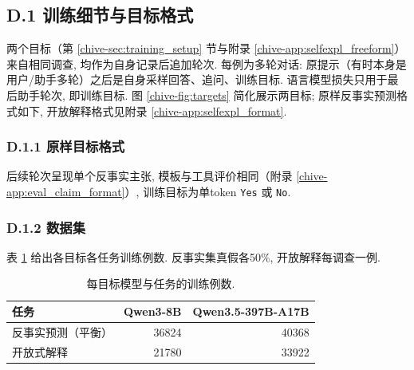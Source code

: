 \subsection*{D.1 训练细节与目标格式}
两个目标（第 \ref{chive-sec:training_setup} 节与附录 \ref{chive-app:selfexpl_freeform}）来自相同调查, 均作为自身记录后追加轮次. 每例为多轮对话: 原提示（有时本身是用户/助手多轮）之后是自身采样回答、追问、训练目标. 语言模型损失只用于最后助手轮次, 即训练目标. 图 \ref{chive-fig:targets} 简化展示两目标; 原样反事实预测格式如下, 开放解释格式见附录 \ref{chive-app:selfexpl_format}.

\subsubsection*{D.1.1 原样目标格式}
后续轮次呈现单个反事实主张, 模板与工具评价相同（附录 \ref{chive-app:eval_claim_format}）, 训练目标为单token \texttt{Yes} 或 \texttt{No}.

\subsubsection*{D.1.2 数据集}
表 \ref{chive-tab:training_data} 给出各目标各任务训练例数. 反事实集真假各50\%, 开放解释每调查一例.
\begin{table}[ht]\centering
\begin{tabular}{lrr}\toprule
任务 & Qwen3-8B & Qwen3.5-397B-A17B\\\midrule
反事实预测（平衡） & 36824 & 40368\\
开放式解释 & 21780 & 33922\\\bottomrule
\end{tabular}
\caption{每目标模型与任务的训练例数.}\label{chive-tab:training_data}
\end{table}

